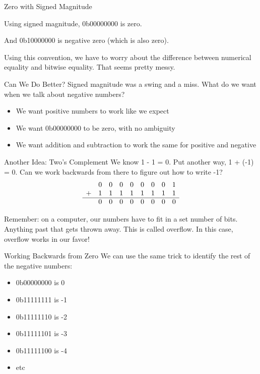 \begin{frame}{Zero with Signed Magnitude}

    Using signed magnitude, 0b00000000 is zero.

    And 0b10000000 is negative zero (which is also zero).

    Using this convention, we have to worry about the difference between numerical
    equality and bitwise equality. That seems pretty messy.
\end{frame}

\begin{frame}{Can We Do Better?}
    Signed magnitude was a swing and a miss. What do we want when we talk about negative numbers?
    \begin{itemize}
        \item We want positive numbers to work like we expect
        \item We want 0b00000000 to be zero, with no ambiguity
        \item We want addition and subtraction to work the same for positive and negative
    \end{itemize}
\end{frame}

\begin{frame}{Another Idea: Two's Complement}
    We know 1 - 1 = 0. Put another way, 1 + (-1) = 0. Can we work backwards from there to figure out how to write -1?
    \[
        \begin{array}{ccccccccc}
              & 0 & 0 & 0 & 0 & 0 & 0 & 0 & 1 \\
            + & 1 & 1 & 1 & 1 & 1 & 1 & 1 & 1 \\
            \hline
              & 0 & 0 & 0 & 0 & 0 & 0 & 0 & 0 \\
        \end{array}
    \]

    Remember: on a computer, our numbers have to fit in a set number of bits.
    Anything past that gets thrown away. This is called overflow. In this case,
    overflow works in our favor!
\end{frame}

\begin{frame}{Working Backwards from Zero}
    We can use the same trick to identify the rest of the negative numbers:
    \begin{itemize}
        \item 0b00000000 is 0
        \item 0b11111111 is -1
        \item 0b11111110 is -2
        \item 0b11111101 is -3
        \item 0b11111100 is -4
        \item etc
    \end{itemize}
\end{frame}

